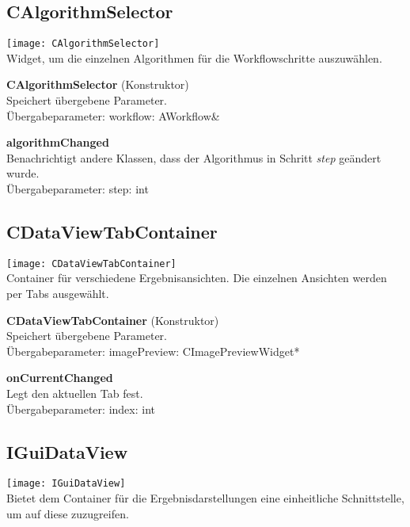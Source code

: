 \subsection{CAlgorithmSelector}
\texttt{[image: CAlgorithmSelector]}\\
Widget, um die einzelnen Algorithmen für die Workflowschritte auszuwählen.
\beginMembers
\item \textbf{CAlgorithmSelector} (Konstruktor) \\Speichert übergebene Parameter. \\Übergabeparameter: workflow: AWorkflow\&
\closeMembers
\beginSignals
\item \textbf{algorithmChanged} \\ Benachrichtigt andere Klassen, dass der Algorithmus in Schritt \textit{step} geändert wurde. \\Übergabeparameter: step: int
\closeMembers

\subsection{CDataViewTabContainer}
\texttt{[image: CDataViewTabContainer]}\\
Container für verschiedene Ergebnisansichten. Die einzelnen Ansichten werden per Tabs ausgewählt.
\beginMembers
\item \textbf{CDataViewTabContainer} (Konstruktor) \\Speichert übergebene Parameter. \\Übergabeparameter: imagePreview: CImagePreviewWidget*
\closeMembers
\beginSlots
\item \textbf{onCurrentChanged} \\Legt den aktuellen Tab fest. \\Übergabeparameter: index: int
\closeMembers

\subsection{IGuiDataView}
\texttt{[image: IGuiDataView]}\\
Bietet dem Container für die Ergebnisdarstellungen eine einheitliche Schnittstelle, um auf diese zuzugreifen.
\beginMembers
{}
\closeMembers

